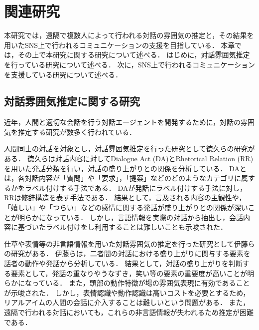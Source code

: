 \chapter{関連研究\label{sec:related_researchs}}
\thispagestyle{plain}

本研究では，遠隔で複数人によって行われる対話の雰囲気の推定と，その結果を用いたSNS上で行われるコミュニケーションの支援を目指している．
本章では，その上で本研究に関する研究について述べる．
はじめに，対話雰囲気推定を行っている研究について述べる．
次に，SNS上で行われるコミュニケーションを支援している研究について述べる．

\section{対話雰囲気推定に関する研究}
近年，人間と適切な会話を行う対話エージェントを開発するために，対話の雰囲気を推定する研究が数多く行われている．

人間同士の対話を対象とし，対話雰囲気推定を行った研究として徳久ら\cite{Tokuhisa}の研究がある．
徳久らは対話内容に対してDialogue Act (DA)とRhetorical Relation (RR)を用いた発話分類を行い，対話の盛り上がりとの関係を分析している．
DAとは，各対話内容が「質問」や「要求」，「提案」などのどのようなカテゴリに属するかをラベル付けする手法である．
DAが発話にラベル付けする手法に対し，RRは修辞構造を表す手法である．
結果として，言及される内容の主観性や，「嬉しい」や「つらい」などの感情に関する発話が盛り上がりとの関係が深いことが明らかになっている．
しかし，言語情報を実際の対話から抽出し，会話内容に基づいたラベル付けをし利用することは難しいことも示唆された．

仕草や表情等の非言語情報を用いた対話雰囲気の推定を行った研究として伊藤ら\cite{Ito}の研究がある．
伊藤らは，二者間の対話における盛り上がりに関与する要素を話者の動作や発話から分析している．
結果として，対話の盛り上がりを判断する要素として，発話の重なりやうなずき，笑い等の要素の重要度が高いことが明らかになっている．
また，頭部の動作特徴が場の雰囲気表現に有効であることが示唆された．
しかし，表情認識や動作認識は高いコストを必要とするため，リアルアイムの人間の会話に介入することは難しいという問題がある．
また，遠隔で行われる対話においても，これらの非言語情報が失われるため推定が困難である．

